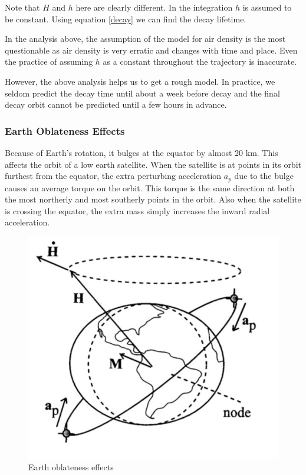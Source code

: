 \documentclass{article}
\theoremstyle{definition}
\begin{document}
Note that $H$ and $h$ here are clearly different. In the integration $h$ is assumed to be constant. Using equation \ref{decay} we can find the decay lifetime.

In the analysis above, the assumption of the model for air density is the most questionable as air density is very erratic and changes with time and place. Even the practice of assuming $h$ as a constant throughout the trajectory is inaccurate.

However, the above analysis helps us to get a rough model. In practice, we seldom predict the decay time until about a week before decay and the final decay orbit cannot be predicted until a few hours in advance.

\subsubsection{Earth Oblateness Effects}

Because of Earth's rotation, it bulges at the equator by almost 20 km. This affects the orbit of a low earth satellite.
When the satellite is at points in its orbit furthest from the equator, the extra perturbing acceleration $a_p$ due to the bulge causes an average torque on the orbit. 
This torque is the same direction at both the most northerly and most southerly points in the orbit. Also when the satellite is crossing the equator, the extra mass simply increases the inward radial acceleration.

\begin{figure}[h]
    \centering
    \includegraphics[scale=0.2]{image 9.jpeg}
    \caption{Earth oblateness effects}
    \label{fig:oblateness}
\end{figure}
\end{document}
